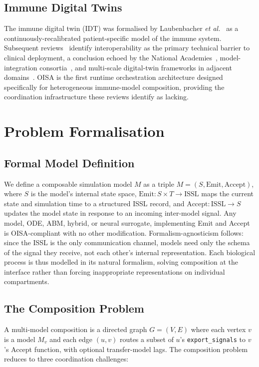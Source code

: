 \documentclass[conference,letterpaper,10pt]{IEEEtran}
\begin{document}
\subsection{Immune Digital Twins}

The immune digital twin (IDT) was formalised by Laubenbacher \emph{et
al.}~\cite{laubenbacher2022roadmap} as a continuously-recalibrated
patient-specific model of the immune system. Subsequent
reviews~\cite{laubenbacher2024forum,niarakis2024idt} identify
interoperability as the primary technical barrier to clinical deployment,
a conclusion echoed by the National Academies~\cite{nasem2023digitaltwins},
model-integration consortia~\cite{karr2022modelintegration}, and
multi-scale digital-twin frameworks in adjacent
domains~\cite{viceconti2024vht}. OISA is the first runtime orchestration
architecture designed specifically for heterogeneous immune-model
composition, providing the coordination infrastructure these reviews
identify as lacking.

\section{Problem Formalisation}

\subsection{Formal Model Definition}
We define a composable simulation model $M$ as a triple
$M\!=\!(S,\mathrm{Emit},\mathrm{Accept})$, where $S$ is the model's
internal state space,
$\mathrm{Emit}\!:\!S\!\times\!T\!\to\!\mathrm{ISSL}$ maps the current
state and simulation time to a structured ISSL record, and
$\mathrm{Accept}\!:\!\mathrm{ISSL}\!\to\!S$ updates the model state in
response to an incoming inter-model signal. Any model, ODE, ABM, hybrid,
or neural surrogate, implementing Emit and Accept is OISA-compliant with no
other modification. Formalism-agnosticism follows: since the ISSL is the
only communication channel, models need only the schema of the signal they
receive, not each other's internal representation. Each biological process
is thus modelled in its natural formalism, solving composition at the
interface rather than forcing inappropriate representations on individual
compartments.

\subsection{The Composition Problem}\label{sec:composition}
A multi-model composition is a directed graph $G\!=\!(V,E)$ where each
vertex $v$ is a model $M_v$ and each edge $(u,v)$ routes a subset of $u$'s
\texttt{export\_signals} to $v$'s Accept function, with optional
transfer-model lags. The composition problem reduces to three coordination
challenges:
\end{document}
